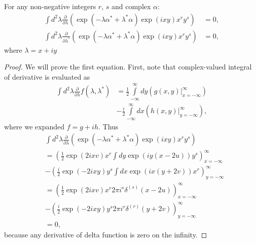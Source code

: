 \begin{lemma}
\label{lmm:c-numbers:zero-integrals}
For any non-negative integers $r$, $s$ and complex $\alpha$:
\begin{equation*}
\begin{split}
	\int d^2\lambda
		\frac{\partial}{\partial \lambda} \left(
			\exp(-\lambda \alpha^* + \lambda^* \alpha)
			\exp(ixy) x^r y^s
		\right)
	& = 0, \\
	\int d^2\lambda
		\frac{\partial}{\partial \lambda^*}
		\left(
			\exp(-\lambda \alpha^* + \lambda^* \alpha)
			\exp(ixy) x^r y^s
		\right)
	& = 0,
\end{split}
\end{equation*}
where $\lambda = x + iy$
\end{lemma}
\begin{proof}
We will prove the first equation.
First, note that complex-valued integral of derivative is evaluated as
\begin{equation*}
\begin{split}
	\int d^2\lambda \frac{\partial}{\partial \lambda} f(\lambda, \lambda^*)
	& =	\frac{1}{2} \int\limits_{-\infty}^{\infty} dy \left(
			\left. g(x, y) \right|_{x=-\infty}^{\infty}
		\right) \\
	& - \frac{i}{2} \int\limits_{-\infty}^{\infty} dx \left(
			\left. h(x, y) \right|_{y=-\infty}^{\infty}
		\right),
\end{split}
\end{equation*}
where we expanded $f = g + ih$.
Thus
\begin{equation*}
\begin{split}
	& \int d^2\lambda
		\frac{\partial}{\partial \lambda} \left(
			\exp(-\lambda \alpha^* + \lambda^* \alpha)
			\exp(ixy) x^r y^s
		\right) \\
	& = \left(
			\frac{1}{2} \exp(2ixv) x^r \int dy \exp(iy(x-2u)) y^s
		\right)_{x = -\infty}^\infty \\
	& - \left(
			\frac{i}{2} \exp(-2ixy) y^s \int dx \exp(ix(y+2v)) x^r
		\right)_{y = -\infty}^\infty \\
	& = \left(
			\frac{1}{2} \exp(2ixv) x^r 2 \pi i^s \delta^{(s)}(x-2u)
		\right)_{x = -\infty}^\infty \\
	& - \left(
			\frac{i}{2} \exp(-2ixy) y^s 2 \pi i^r \delta^{(r)}(y+2v)
		\right)_{y = -\infty}^\infty \\
	& = 0,
\end{split}
\end{equation*}
because any derivative of delta function is zero on the infinity.
\end{proof}
